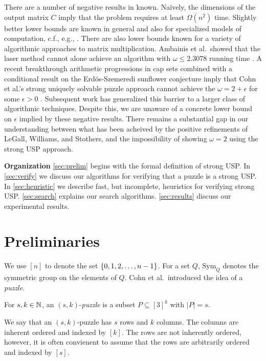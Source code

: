 \documentclass[11pt]{article}
\newcommand\sse{\subseteq}
\newcommand\Sym[1]{\ensuremath{\mathrm{Sym}_{#1}}}
\begin{document}
There are a number of negative results in known.  Na\"{i}vely, the
dimensions of the output matrix $C$ imply that the problem requires at
least $\Omega(n^2)$ time.  Slightly better lower bounds are known in
general and also for specialized models of computation, c.f., e.g.,
\cite{shp03,kam05}.  There are also lower bounds known for a variety
of algorithmic approaches to matrix multiplication.  Ambainis et
al.~showed that the laser method cannot alone achieve an algorithm
with $\omega \le 2.3078$ running time \cite{afl15}.  A recent
breakthrough arithmetic progressions in cap sets \cite{clp17} combined
with a conditional result on the Erd\"{o}s-Szemeredi sunflower
conjecture \cite{asu13} imply that Cohn et al.'s strong uniquely
solvable puzzle approach cannot achieve the $\omega = 2 + \epsilon$
for some $\epsilon > 0$ \cite{bccgu16}.  Subsequent work has
generalized this barrier \cite{avw18a,avw18b} to a larger class of
algorithmic techniques.  Despite this, we are unaware of a concrete
lower bound on $\epsilon$ implied by these negative results.  There
remains a substantial gap in our understanding between what has been
acheived by the positive refinements of LeGall, Williams, and
Stothers, and the impossibility of showing $\omega = 2$ using the
strong USP approach.

\smallskip
\noindent\textbf{Organization} \autoref{sec:prelim} begins with the formal definition of strong USP.
In \autoref{sec:verify} we discuss our algorithms for verifying that a
puzzle is a strong USP.  In \autoref{sec:heuristic} we describe fast,
but incomplete, heuristics for verifying strong USP.
\autoref{sec:search} explains our search algorithms.
\autoref{sec:results} discuss our experimental results.


\section{Preliminaries}
\label{sec:prelim}

\newcommand\ordset[1]{\ensuremath{[#1]}}

We use $\ordset{n}$ to denote the set $\left\{ 0,1,2,\ldots, n-1 \right\}$.  For
a set $Q$, $\Sym{Q}$ denotes the symmetric group on the elements of
$Q$.
Cohn et al.~introduced the idea of a \emph{puzzle}.
\begin{definition}[Puzzle]
  For $s, k \in \mathbb{N}$, an $(s,k)$-\emph{puzzle} is a
  subset $P \sse \ordset{3}^k$ with $|P| = s$.
\end{definition}
\noindent We say that an $(s,k)$-puzzle has $s$ rows and $k$ columns.  The
columns are inherent ordered and indexed by $\ordset{k}$.  The rows
are not inherently ordered, however, it is often convienent to assume
that the rows are arbitrarily ordered and indexed by $\ordset{s}$.
\end{document}
